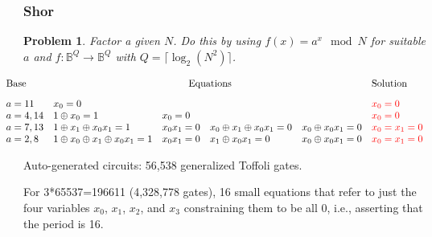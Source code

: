 \documentclass{beamer}
\newcommand{\red}[1]{{\color{red}{#1}}}
\newcommand{\Bool}{\ensuremath{\mathbb{B}}}
\newtheorem{prob}{Problem}
\begin{document}

\begin{frame}

  \frametitle{Shor}

\begin{prob}
  Factor a given $N$. Do this by using $f(x) = a^x \mod N$ for suitable $a$ and
  $f : \Bool^Q \rightarrow \Bool^Q$ with $Q = \lceil \log_2 \left(N^2\right) \rceil$.
\end{prob}

  {\tiny
\[\begin{array}{l@{\quad}lllll}
  \hspace*{-8mm}\textrm{Base} & \multicolumn{4}{c}{\textrm{Equations}} & \textrm{Solution} \\[2ex]
  \hspace*{-8mm} a=11 & x_0 = 0 &&&& \red{x_0 = 0} \\
  \hspace*{-8mm} a=4,14 & 1 \oplus x_0 = 1 & x_0 = 0 && & \red{x_0 = 0} \\
  \hspace*{-8mm} a=7,13 & 1 \oplus x_1 \oplus x_0x_1 = 1 & x_0x_1 = 0 & x_0 \oplus x_1 \oplus x_0x_1 = 0 &  x_0 \oplus x_0x_1 = 0 & \red{x_0=x_1=0} \\
  \hspace*{-8mm} a=2,8 & 1 \oplus x_0 \oplus x_1 \oplus x_0x_1 = 1 & x_0x_1 = 0 & x_1 \oplus x_0x_1 = 0 & x_0 \oplus x_0x_1 = 0  & \red{x_0=x_1=0}
\end{array}\]
  }

  Auto-generated circuits: 56,538 generalized Toffoli gates. 

  \pause
  \vspace*{4mm}
  For 3*65537=196611 (4,328,778 gates),
   16 small equations that refer to just the four variables $x_0$, $x_1$, $x_2$, and $x_3$
constraining them to be all 0, i.e.,
asserting that the period is 16.
\end{frame}
\end{document}

